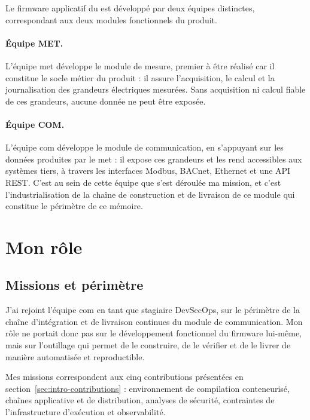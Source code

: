 Le firmware applicatif du \ProduitCourt{} est développé par deux équipes
distinctes, correspondant aux deux modules fonctionnels du produit.

\paragraph{Équipe MET.}
L'équipe \gls{met} développe le module de mesure, premier à être réalisé car
il constitue le socle métier du produit : il assure l'acquisition, le calcul
et la journalisation des grandeurs électriques mesurées. Sans acquisition ni
calcul fiable de ces grandeurs, aucune donnée ne peut être exposée.

\paragraph{Équipe COM.}
L'équipe \gls{com} développe le module de communication, en s'appuyant sur les
données produites par le \gls{met} : il expose ces grandeurs et les rend
accessibles aux systèmes tiers, à travers les interfaces Modbus,
BACnet, Ethernet et une API REST. C'est au sein de cette équipe que s'est
déroulée ma mission, et c'est l'industrialisation de la chaîne de
construction et de livraison de ce module qui constitue le périmètre de ce
mémoire.

\section{Mon rôle}
\label{sec:ctx-role}

\subsection{Missions et périmètre}
\label{ssec:ctx-role-missions}

J'ai rejoint l'équipe \gls{com} en tant que stagiaire DevSecOps, sur le
périmètre de la chaîne d'intégration et de livraison continues du module de
communication. Mon rôle ne portait donc pas sur le développement fonctionnel
du firmware lui-même, mais sur l'outillage qui permet de le construire, de le
vérifier et de le livrer de manière automatisée et reproductible.

Mes missions correspondent aux cinq contributions présentées en
section~\ref{sec:intro-contributions} : environnement de compilation
conteneurisé, chaînes applicative et de distribution, analyses de sécurité,
contraintes de l'infrastructure d'exécution et observabilité.

